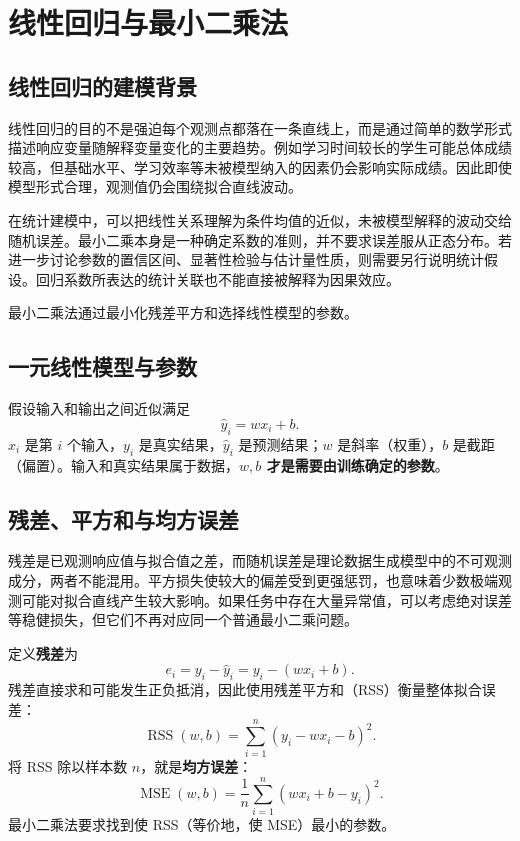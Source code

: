 \section{线性回归与最小二乘法}\label{ch:least-squares}

\subsection{线性回归的建模背景}

线性回归的目的不是强迫每个观测点都落在一条直线上，而是通过简单的数学形式描述响应变量随解释变量变化的主要趋势。例如学习时间较长的学生可能总体成绩较高，但基础水平、学习效率等未被模型纳入的因素仍会影响实际成绩。因此即使模型形式合理，观测值仍会围绕拟合直线波动。

在统计建模中，可以把线性关系理解为条件均值的近似，未被模型解释的波动交给随机误差。最小二乘本身是一种确定系数的准则，并不要求误差服从正态分布。若进一步讨论参数的置信区间、显著性检验与估计量性质，则需要另行说明统计假设。回归系数所表达的统计关联也不能直接被解释为因果效应。

最小二乘法通过最小化残差平方和选择线性模型的参数。

\subsection{一元线性模型与参数}

假设输入和输出之间近似满足
\begin{equation}\label{eq:simple-lm}
\hat y_i=wx_i+b.
\end{equation}
$x_i$ 是第 $i$ 个输入，$y_i$ 是真实结果，$\hat y_i$ 是预测结果；$w$ 是斜率（权重），$b$ 是截距（偏置）。输入和真实结果属于数据，\textbf{$w,b$ 才是需要由训练确定的参数}。

\subsection{残差、平方和与均方误差}

残差是已观测响应值与拟合值之差，而随机误差是理论数据生成模型中的不可观测成分，两者不能混用。平方损失使较大的偏差受到更强惩罚，也意味着少数极端观测可能对拟合直线产生较大影响。如果任务中存在大量异常值，可以考虑绝对误差等稳健损失，但它们不再对应同一个普通最小二乘问题。

定义\textbf{残差}为
\begin{equation}\label{eq:linear-residual}
e_i=y_i-\hat y_i=y_i-(wx_i+b).
\end{equation}
残差直接求和可能发生正负抵消，因此使用残差平方和（RSS）衡量整体拟合误差：
\begin{equation}\label{eq:linear-rss}
\operatorname{RSS}(w,b)=\sum_{i=1}^{n}(y_i-wx_i-b)^2.
\end{equation}
将 RSS 除以样本数 $n$，就是\textbf{均方误差}：
\begin{equation}\label{eq:linear-mse}
\operatorname{MSE}(w,b)=\frac1n\sum_{i=1}^{n}(wx_i+b-y_i)^2.
\end{equation}
最小二乘法要求找到使 RSS（等价地，使 MSE）最小的参数。

